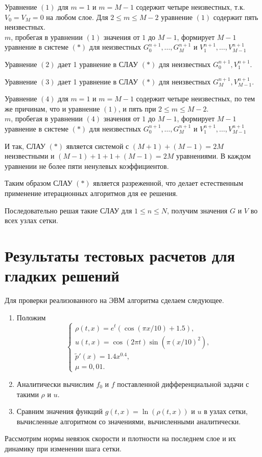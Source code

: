 \documentclass[a4paper, 11pt]{article}
\begin{document}
Уравнение $(1)$ для $m = 1$ и $m=M-1$ содержит четыре неизвестных, т.к. $V_0 = V_M = 0$ на любом слое. Для $2 \leqslant m \leqslant M - 2$ уравнение $(1)$ содержит пять неизвестных.\\ 
$m$, пробегая в уравнении $(1)$ значения от $1$ до $M - 1$, формирует $M-1$ уравнение в системе $(*)$ для неизвестных $G_0^{n+1}, \ldots , G_M^{n+1}$ и $V_1^{n+1}, \ldots , V_{M-1}^{n+1}$

Уравнение $(2)$ дает 1 уравнение в СЛАУ $(*)$ для неизвестных $G_0^{n+1}, V_1^{n+1}$.

Уравнение $(3)$ дает 1 уравнение в СЛАУ $(*)$ для неизвестных $G_M^{n+1}, V_{M-1}^{n+1}$.

Уравнение $(4)$ для $m =1$ и $m = M-1$ содержит четыре неизвестных, по тем же причинам, что и уравнение $(1)$, и пять при $2 \leqslant m \leqslant M - 2$.\\
$m$, пробегая в уравнении $(4)$ значения от $1$ до $M - 1$, формирует $M-1$ уравнение в системе $(*)$ для неизвестных $G_0^{n+1}, \ldots , G_M^{n+1}$ и $V_1^{n+1}, \ldots , V_{M-1}^{n+1}$

И так, СЛАУ $(*)$ является системой с $(M+1) + (M-1) = 2M$ неизвестными и $(M-1) + 1 + 1 + (M-1) = 2M$ уравнениями. В каждом уравнении не более пяти ненулевых коэффициентов.

Таким образом СЛАУ $(*)$ является разреженной, что делает естественным применение итерационных алгоритмов для ее решения.

Последовательно решая такие СЛАУ для $1 \leqslant n \leqslant N$, получим значения $G$ и $V$ во всех узлах сетки.

\section{Результаты тестовых расчетов для гладких решений}
Для проверки реализованного на ЭВМ алгоритма сделаем следующее.
\begin{enumerate}
\item Положим 
$$
\begin{cases}
\rho (t, x) = e^t (\cos (\pi x / 10) + 1.5), \\
u (t, x) = \cos (2 \pi t) \sin (\pi (x/10)^2), \\
\tilde{p}' (x) = 1.4x^{0.4}, \\
\mu =  0,01.
\end{cases}
$$
\item Аналитически вычислим $f_0$ и $f$ поставленной дифференциальной задачи с такими $\rho$ и $u$.
\item Сравним значения функций $g (t, x) = \ln (\rho (t, x))$ и $u$ в узлах сетки, вычисленные алгоритмом со значениями, вычисленными аналитически.
\end{enumerate}
Рассмотрим нормы невязок скорости и плотности на последнем слое и их динамику при изменении шага сетки.
\enlargethispage{5\baselineskip}\\
\end{document}
